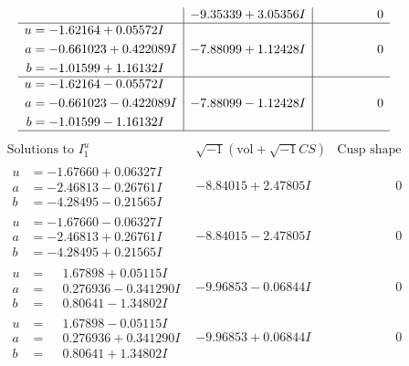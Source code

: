 \documentclass[1p]{elsarticle_modified}
\theoremstyle{definition}
\newcommand{\I}{\sqrt{-1}}
\begin{document}
$$\begin{array}{c|c|c}
 & -9.35339 + 3.05356 I & \phantom{-0.000000 } 0 \\ \hline\begin{aligned}
u &= -1.62164 + 0.05572 I \\
a &= -0.661023 + 0.422089 I \\
b &= -1.01599 + 1.16132 I\end{aligned}
 & -7.88099 + 1.12428 I & \phantom{-0.000000 } 0 \\ \hline\begin{aligned}
u &= -1.62164 - 0.05572 I \\
a &= -0.661023 - 0.422089 I \\
b &= -1.01599 - 1.16132 I\end{aligned}
 & -7.88099 - 1.12428 I & \phantom{-0.000000 } 0\\
 \hline 
 \end{array}$$\newpage$$\begin{array}{c|c|c}  
\text{Solutions to }I^u_{1}& \I (\text{vol} + \sqrt{-1}CS) & \text{Cusp shape}\\
 \hline 
\begin{aligned}
u &= -1.67660 + 0.06327 I \\
a &= -2.46813 - 0.26761 I \\
b &= -4.28495 - 0.21565 I\end{aligned}
 & -8.84015 + 2.47805 I & \phantom{-0.000000 } 0 \\ \hline\begin{aligned}
u &= -1.67660 - 0.06327 I \\
a &= -2.46813 + 0.26761 I \\
b &= -4.28495 + 0.21565 I\end{aligned}
 & -8.84015 - 2.47805 I & \phantom{-0.000000 } 0 \\ \hline\begin{aligned}
u &= \phantom{-}1.67898 + 0.05115 I \\
a &= \phantom{-}0.276936 - 0.341290 I \\
b &= \phantom{-}0.80641 - 1.34802 I\end{aligned}
 & -9.96853 - 0.06844 I & \phantom{-0.000000 } 0 \\ \hline\begin{aligned}
u &= \phantom{-}1.67898 - 0.05115 I \\
a &= \phantom{-}0.276936 + 0.341290 I \\
b &= \phantom{-}0.80641 + 1.34802 I\end{aligned}
 & -9.96853 + 0.06844 I & \phantom{-0.000000 } 0 \\ \hline\begin{aligned}

\end{aligned}
\end{array}$$
\end{document}
